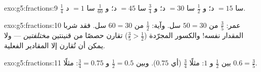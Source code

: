 \begin{solution}{exo:g5:fractions:9}
$\frac14$ سا $= 15$ د؛ و $\frac12$ سا $= 30$ د؛ و $\frac34$ سا $= 45$
د؛ و $\frac{1}{60}$ سا $= 1$ د.
\end{solution}

\begin{solution}{exo:g5:fractions:10}
عمر: $\frac35$ من $50 = 30$ سل. وآية: $\frac12$ من $60 = 30$ سل.
فقد شربا المقدار نفسه! والكسور المجرّدة ($\frac35 > \frac12$)
تقارن حصصًا من قنينتين \emph{مختلفتين} --- ولا يمكن أن تُقارن إلا
المقادير الفعلية.
\end{solution}

\begin{solution}{exo:g5:fractions:11}
بين $\frac12$ و $1$: مثلًا $\frac34$ (أي $0.75$).
وبين $\frac12 = 0.5$ و $\frac34 = 0.75$: مثلًا $0.6 =
\frac35$.
\end{solution}
